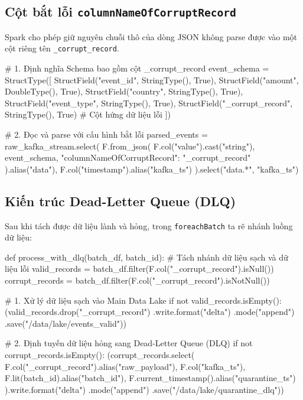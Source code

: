 \documentclass[12pt]{article}
\begin{document}
\subsection{Cột bắt lỗi \texttt{columnNameOfCorruptRecord}}

Spark cho phép giữ nguyên chuỗi thô của dòng JSON không parse được vào một cột riêng tên \texttt{\_corrupt\_record}.

\begin{aivnpybox}
# 1. Định nghĩa Schema bao gồm cột _corrupt_record
event_schema = StructType([
    StructField("event_id", StringType(), True),
    StructField("amount", DoubleType(), True),
    StructField("country", StringType(), True),
    StructField("event_type", StringType(), True),
    StructField("_corrupt_record", StringType(), True) # Cột hứng dữ liệu lỗi
])

# 2. Đọc và parse với cấu hình bắt lỗi
parsed_events = raw_kafka_stream.select(
    F.from_json(
        F.col("value").cast("string"),
        event_schema,
        {"columnNameOfCorruptRecord": "_corrupt_record"}
    ).alias("data"),
    F.col("timestamp").alias("kafka_ts")
).select("data.*", "kafka_ts")
\end{aivnpybox}

\subsection{Kiến trúc Dead-Letter Queue (DLQ)}

Sau khi tách được dữ liệu lành và hỏng, trong \texttt{foreachBatch} ta rẽ nhánh luồng dữ liệu:

\begin{aivnpybox}
def process_with_dlq(batch_df, batch_id):
    # Tách nhánh dữ liệu sạch và dữ liệu lỗi
    valid_records = batch_df.filter(F.col("_corrupt_record").isNull())
    corrupt_records = batch_df.filter(F.col("_corrupt_record").isNotNull())

    # 1. Xử lý dữ liệu sạch vào Main Data Lake
    if not valid_records.isEmpty():
        (valid_records.drop("_corrupt_record")
            .write.format("delta")
            .mode("append")
            .save("/data/lake/events_valid"))

    # 2. Định tuyến dữ liệu hỏng sang Dead-Letter Queue (DLQ)
    if not corrupt_records.isEmpty():
        (corrupt_records.select(
            F.col("_corrupt_record").alias("raw_payload"),
            F.col("kafka_ts"),
            F.lit(batch_id).alias("batch_id"),
            F.current_timestamp().alias("quarantine_ts")
        ).write.format("delta")
         .mode("append")
         .save("/data/lake/quarantine_dlq"))
\end{aivnpybox}
\end{document}

